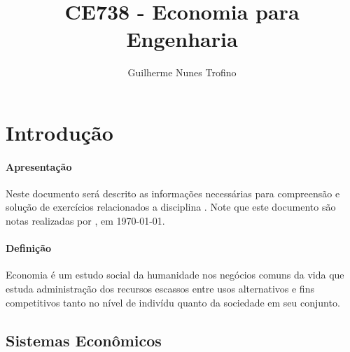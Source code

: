 \documentclass{article}
\title{CE738 - Economia para Engenharia}
\author{Guilherme Nunes Trofino}
\begin{document}
    \maketitle
\newpage

    \tableofcontents
\newpage

    \section{Introdução}
        \paragraph{Apresentação}Neste documento será descrito as informações necessárias para compreensão e solução de exercícios relacionados a disciplina \thetitle . Note que este documento são notas realizadas por \theauthor , em \today.

        \paragraph{Definição}Economia é um estudo social da humanidade nos negócios comuns da vida que estuda administração dos recursos escassos entre usos alternativos e fins competitivos tanto no nível de indivídu quanto da sociedade em seu conjunto.

        \subsection{Sistemas Econômicos}
\end{document}
